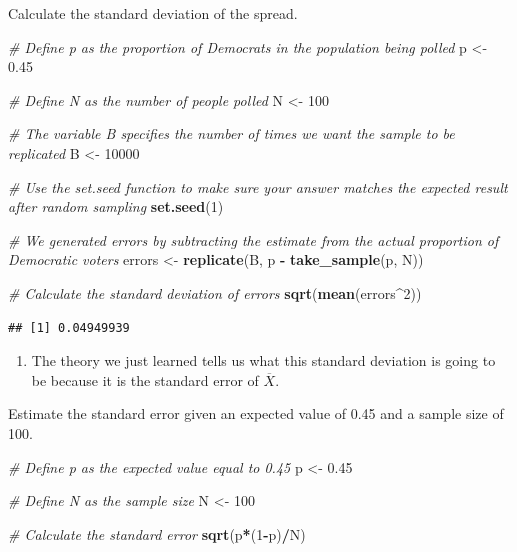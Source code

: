 \documentclass[
]{article}
\newenvironment{Shaded}{\begin{snugshade}}{\end{snugshade}}
\newcommand{\CommentTok}[1]{\textcolor[rgb]{0.56,0.35,0.01}{\textit{#1}}}
\newcommand{\DecValTok}[1]{\textcolor[rgb]{0.00,0.00,0.81}{#1}}
\newcommand{\FloatTok}[1]{\textcolor[rgb]{0.00,0.00,0.81}{#1}}
\newcommand{\KeywordTok}[1]{\textcolor[rgb]{0.13,0.29,0.53}{\textbf{#1}}}
\newcommand{\NormalTok}[1]{#1}
\newcommand{\OperatorTok}[1]{\textcolor[rgb]{0.81,0.36,0.00}{\textbf{#1}}}
\newcommand{\StringTok}[1]{\textcolor[rgb]{0.31,0.60,0.02}{#1}}
\providecommand{\tightlist}{%
  \setlength{\itemsep}{0pt}\setlength{\parskip}{0pt}}
\begin{document}
Calculate the standard deviation of the spread.

\begin{Shaded}
\begin{Highlighting}[]
\CommentTok{\# Define \textasciigrave{}p\textasciigrave{} as the proportion of Democrats in the population being polled}
\NormalTok{p \textless{}{-}}\StringTok{ }\FloatTok{0.45}

\CommentTok{\# Define \textasciigrave{}N\textasciigrave{} as the number of people polled}
\NormalTok{N \textless{}{-}}\StringTok{ }\DecValTok{100}

\CommentTok{\# The variable \textasciigrave{}B\textasciigrave{} specifies the number of times we want the sample to be replicated}
\NormalTok{B \textless{}{-}}\StringTok{ }\DecValTok{10000}

\CommentTok{\# Use the \textasciigrave{}set.seed\textasciigrave{} function to make sure your answer matches the expected result after random sampling}
\KeywordTok{set.seed}\NormalTok{(}\DecValTok{1}\NormalTok{)}

\CommentTok{\# We generated \textasciigrave{}errors\textasciigrave{} by subtracting the estimate from the actual proportion of Democratic voters}
\NormalTok{errors \textless{}{-}}\StringTok{ }\KeywordTok{replicate}\NormalTok{(B, p }\OperatorTok{{-}}\StringTok{ }\KeywordTok{take\_sample}\NormalTok{(p, N))}

\CommentTok{\# Calculate the standard deviation of \textasciigrave{}errors\textasciigrave{}}
\KeywordTok{sqrt}\NormalTok{(}\KeywordTok{mean}\NormalTok{(errors}\OperatorTok{\^{}}\DecValTok{2}\NormalTok{))}
\end{Highlighting}
\end{Shaded}

\begin{verbatim}
## [1] 0.04949939
\end{verbatim}

\begin{enumerate}
\def\labelenumi{\arabic{enumi}.}
\setcounter{enumi}{5}
\tightlist
\item
  The theory we just learned tells us what this standard deviation is
  going to be because it is the standard error of \(\overline{X}\).
\end{enumerate}

Estimate the standard error given an expected value of 0.45 and a sample
size of 100.

\begin{Shaded}
\begin{Highlighting}[]
\CommentTok{\# Define \textasciigrave{}p\textasciigrave{} as the expected value equal to 0.45}
\NormalTok{p \textless{}{-}}\StringTok{ }\FloatTok{0.45}

\CommentTok{\# Define \textasciigrave{}N\textasciigrave{} as the sample size}
\NormalTok{N \textless{}{-}}\StringTok{ }\DecValTok{100}

\CommentTok{\# Calculate the standard error}
\KeywordTok{sqrt}\NormalTok{(p}\OperatorTok{*}\NormalTok{(}\DecValTok{1}\OperatorTok{{-}}\NormalTok{p)}\OperatorTok{/}\NormalTok{N)}
\end{Highlighting}
\end{Shaded}
\end{document}
